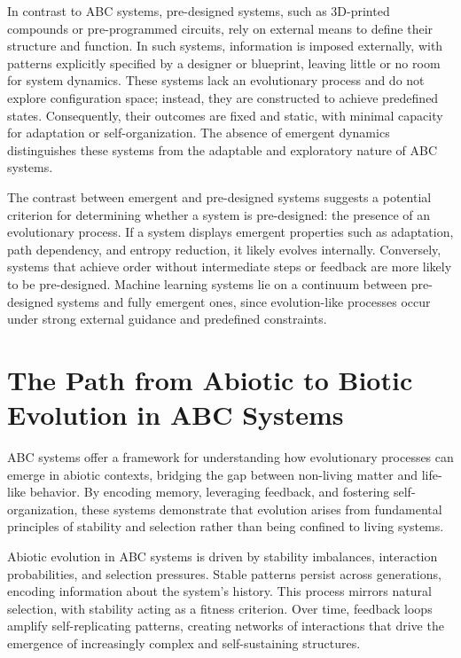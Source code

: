 \documentclass[entropy,article,submit,pdftex,moreauthors]{Definitions/mdpi}
\begin{document}
In contrast to ABC systems, pre-designed systems, such as 3D-printed compounds or pre-programmed circuits, rely on external means to define their structure and function. In such systems, information is imposed externally, with patterns explicitly specified by a designer or blueprint, leaving little or no room for system dynamics. These systems lack an evolutionary process and do not explore configuration space; instead, they are constructed to achieve predefined states. Consequently, their outcomes are fixed and static, with minimal capacity for adaptation or self-organization. The absence of emergent dynamics distinguishes these systems from the adaptable and exploratory nature of ABC systems.

The contrast between emergent and pre-designed systems suggests a potential criterion for determining whether a system is pre-designed: the presence of an evolutionary process. If a system displays emergent properties such as adaptation, path dependency, and entropy reduction, it likely evolves internally. Conversely, systems that achieve order without intermediate steps or feedback are more likely to be pre-designed. Machine learning systems lie on a continuum between pre-designed systems and fully emergent ones, since evolution-like processes occur under strong external guidance and predefined constraints.


\section{The Path from Abiotic to Biotic Evolution in ABC Systems}

ABC systems offer a framework for understanding how evolutionary processes can emerge in abiotic contexts, bridging the gap between non-living matter and life-like behavior. By encoding memory, leveraging feedback, and fostering self-organization, these systems demonstrate that evolution arises from fundamental principles of stability and selection rather than being confined to living systems.

Abiotic evolution in ABC systems is driven by stability imbalances, interaction probabilities, and selection pressures. Stable patterns persist across generations, encoding information about the system’s history. This process mirrors natural selection, with stability acting as a fitness criterion. Over time, feedback loops amplify self-replicating patterns, creating networks of interactions that drive the emergence of increasingly complex and self-sustaining structures.
\end{document}
